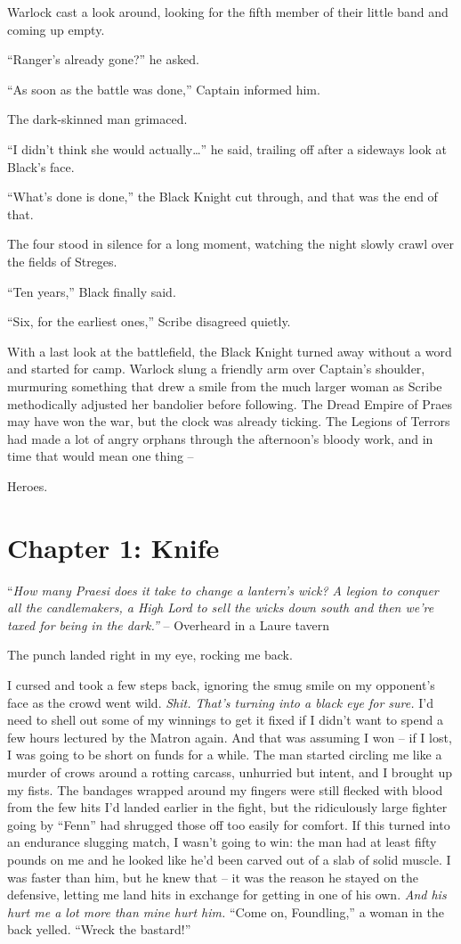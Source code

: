 \documentclass[12pt, openany]{book}
\begin{document}
Warlock cast a look around, looking for the fifth member of their little band and coming up empty.

“Ranger’s already gone?” he asked.

“As soon as the battle was done,” Captain informed him.

The dark-skinned man grimaced.

“I didn’t think she would actually…” he said, trailing off after a sideways look at Black’s face.

“What’s done is done,” the Black Knight cut through, and that was the end of that.

The four stood in silence for a long moment, watching the night slowly crawl over the fields of Streges.

“Ten years,” Black finally said.

“Six, for the earliest ones,” Scribe disagreed quietly.

With a last look at the battlefield, the Black Knight turned away without a word and started for camp. Warlock slung a friendly arm over Captain’s shoulder, murmuring something that drew a smile from the much larger woman as Scribe methodically adjusted her bandolier before following. The Dread Empire of Praes may have won the war, but the clock was already ticking. The Legions of Terrors had made a lot of angry orphans through the afternoon’s bloody work, and in time that would mean one thing –

Heroes.
\clearpage
\chapter{Chapter 1: Knife}

“\textit{How many Praesi does it take to change a lantern’s wick?}
\textit{A legion to conquer all the candlemakers, a High Lord to sell the wicks down south and then we’re taxed for being in the dark.”}
– Overheard in a Laure tavern

The punch landed right in my eye, rocking me back.

I cursed and took a few steps back, ignoring the smug smile on my opponent’s face as the crowd went wild. \textit{Shit. That’s turning into a black eye for sure.} I’d need to shell out some of my winnings to get it fixed if I didn’t want to spend a few hours lectured by the Matron again. And that was assuming I won – if I lost, I was going to be short on funds for a while. The man started circling me like a murder of crows around a rotting carcass, unhurried but intent, and I brought up my fists. The bandages wrapped around my fingers were still flecked with blood from the few hits I’d landed earlier in the fight, but the ridiculously large fighter going by “Fenn” had shrugged those off too easily for comfort. If this turned into an endurance slugging match, I wasn’t going to win: the man had at least fifty pounds on me and he looked like he’d been carved out of a slab of solid muscle. I was faster than him, but he knew that – it was the reason he stayed on the defensive, letting me land hits in exchange for getting in one of his own. \textit{And his hurt me a lot more than mine hurt him.} “Come on, Foundling,” a woman in the back yelled. “Wreck the bastard!”
\end{document}
